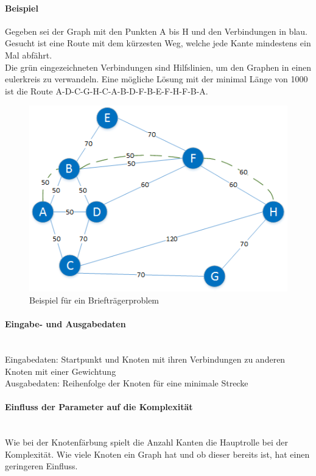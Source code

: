 	\paragraph{Beispiel} Gegeben sei der Graph mit den Punkten A bis H und den Verbindungen in blau.\\
Gesucht ist eine Route mit dem kürzesten Weg, welche jede Kante mindestens ein Mal abfährt. \cite{pearson2004decision}\\
Die grün eingezeichneten Verbindungen sind Hilfslinien, um den Graphen in einen \gls{eulerkreis} zu verwandeln. Eine mögliche Lösung mit der minimal Länge von 1000 ist die 
Route A-D-C-G-H-C-A-B-D-F-B-E-F-H-F-B-A.
\begin{figure}[h]
\centering
\includegraphics[scale=0.8]{images/visio/chinese_postman.png}
\caption[Beispiel für ein Briefträgerproblem]{Beispiel für ein Briefträgerproblem }
\label{fig:chinese_postman_example}
\end{figure}

	\paragraph{Eingabe- und Ausgabedaten}\mbox{}\\
	Eingabedaten: Startpunkt und Knoten mit ihren Verbindungen zu anderen Knoten mit einer Gewichtung\\
	Ausgabedaten: Reihenfolge der Knoten für eine minimale Strecke

	\paragraph{Einfluss der Parameter auf die Komplexität}\mbox{}\\
	Wie bei der Knotenfärbung spielt die Anzahl Kanten die Hauptrolle bei der Komplexität. Wie viele Knoten ein Graph hat und ob dieser bereits  ist, hat einen 
	geringeren Einfluss.

